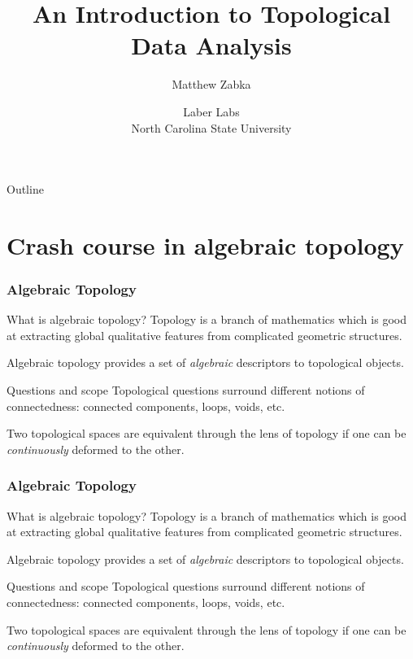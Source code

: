 \documentclass[usenames,dvipsnames,aspectratio=1610]{beamer}
\title{An Introduction to Topological Data Analysis}
\author{Matthew Zabka}
\date{Laber Labs \\ North Carolina State University}
\institute{Southwest Minnesota State University}
\begin{document}
\begin{frame}[plain]
  \maketitle
\end{frame}


\begin{frame}{Outline}
  \tableofcontents
\end{frame}

\section{Crash course in algebraic topology}
\begin{frame}
  \frametitle{Algebraic Topology}
  \begin{block}{What is algebraic topology?}
    Topology is a branch of mathematics which is good at extracting global
    qualitative features from complicated geometric structures. 
    
    Algebraic topology provides a set of {\em algebraic} descriptors to topological objects.
  \end{block}
  \pause

  \begin{block}{Questions and scope}
    Topological questions surround different notions of connectedness:
    connected components, loops, voids, etc.

    Two topological spaces are equivalent through the lens of topology if one
    can be {\em continuously} deformed to the other. 
  \end{block}
\end{frame}

\begin{frame}
  \frametitle{Algebraic Topology}
  \begin{block}{What is algebraic topology?}
    Topology is a branch of mathematics which is good at extracting global
    qualitative features from complicated geometric structures. 
    
    Algebraic topology provides a set of {\em algebraic} descriptors to topological objects.
  \end{block}

  \begin{block}{Questions and scope}
    Topological questions surround different notions of connectedness:
    connected components, loops, voids, etc.

    Two topological spaces are equivalent through the lens of topology if one
    can be {\em continuously} deformed to the other. 
  \end{block}
\end{frame}
\end{document}
